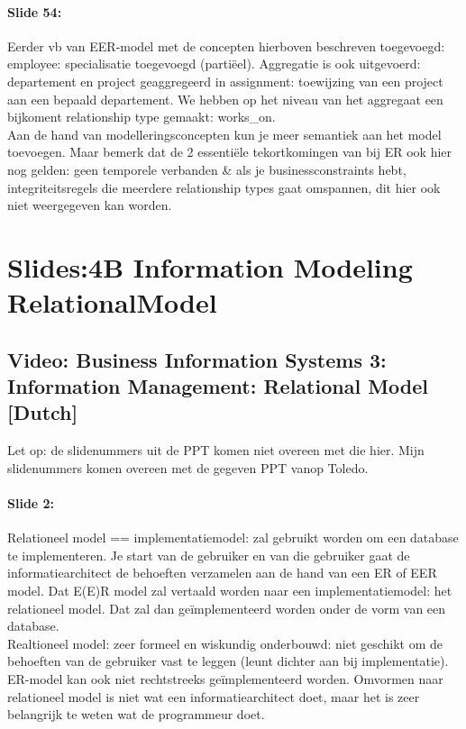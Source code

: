 \documentclass[10pt,a4paper]{report}
\begin{document}
\paragraph{Slide 54:}Eerder vb van EER-model met de concepten hierboven beschreven toegevoegd: employee: specialisatie toegevoegd (partiëel). Aggregatie is ook uitgevoerd: departement en project geaggregeerd in assignment: toewijzing van een project aan een bepaald departement. We hebben op het niveau van het aggregaat een bijkoment relationship type gemaakt: works\_on. \\
Aan de hand van modelleringsconcepten kun je meer semantiek aan het model toevoegen. Maar bemerk dat de 2 essentiële tekortkomingen van bij ER ook hier nog gelden: geen temporele verbanden \& als je businessconstraints hebt, integriteitsregels die meerdere relationship types gaat omspannen, dit hier ook niet weergegeven kan worden.

\section{Slides:4B Information Modeling \- RelationalModel}
\subsection{Video: Business Information Systems 3: Information Management: Relational Model [Dutch]}
Let op: de slidenummers uit de PPT komen niet overeen met die hier. Mijn slidenummers komen overeen met de gegeven PPT vanop Toledo.

\paragraph{Slide 2:}Relationeel model == implementatiemodel: zal gebruikt worden om een database te implementeren.
Je start van de gebruiker en van die gebruiker gaat de informatiearchitect de behoeften verzamelen aan de hand van een ER of EER model. Dat E(E)R model zal vertaald worden naar een implementatiemodel: het relationeel model. Dat zal dan geïmplementeerd worden onder de vorm van een database.\\
Realtioneel model: zeer formeel en wiskundig onderbouwd: niet geschikt om de behoeften van de gebruiker vast te leggen (leunt dichter aan bij implementatie). ER-model kan ook niet rechtstreeks geïmplementeerd worden. Omvormen naar relationeel model is niet wat een informatiearchitect doet, maar het is zeer belangrijk te weten wat de programmeur doet. 
\end{document}
